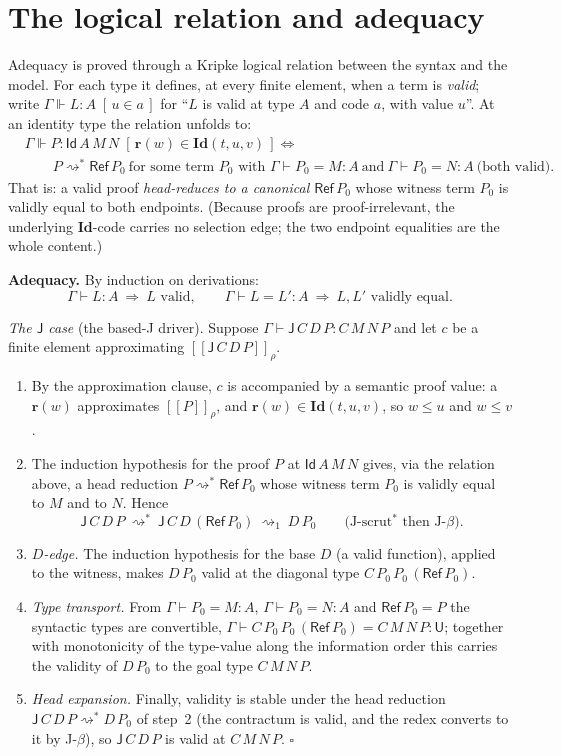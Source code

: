 \documentclass[11pt]{article}
\newcommand{\ty}[3]{#1 \vdash #2 : #3}
\newcommand{\cv}[4]{#1 \vdash #2 = #3 : #4}
\newcommand{\U}{\mathsf{U}}
\newcommand{\Id}{\mathsf{Id}}
\newcommand{\Rf}{\mathsf{Ref}}
\newcommand{\Jelim}{\mathsf{J}}
\newcommand{\redone}{\rightsquigarrow_1}
\newcommand{\red}{\rightsquigarrow^{*}}
\newcommand{\Ga}{\Gamma}
\newcommand{\cId}{\mathbf{Id}}
\newcommand{\rEl}{\mathbf{r}}
\newcommand{\sem}[1]{[\![#1]\!]}
\newcommand{\mem}[2]{#1 \in #2}                 %
\newcommand{\valid}[4]{#1 \Vdash #2 : #3 \;[\,#4\,]}
\begin{document}
\section*{The logical relation and adequacy}

Adequacy is proved through a Kripke logical relation between the syntax and the
model. For each type it defines, at every finite element, when a term is
\emph{valid}; write $\valid{\Ga}{L}{A}{\mem{u}{a}}$ for ``$L$ is valid at type
$A$ and code $a$, with value $u$''. At an identity type the relation unfolds to:
\[
\begin{aligned}
  &\valid{\Ga}{P}{\Id\,A\,M\,N}{\mem{\rEl(w)}{\cId(t,u,v)}} \iff{} \\
  &\qquad P \red \Rf\,P_0 \ \text{for some term $P_0$ with }
  \cv{\Ga}{P_0}{M}{A}\ \text{and}\ \cv{\Ga}{P_0}{N}{A}\ \text{(both valid).}
\end{aligned}
\]
That is: a valid proof \emph{head-reduces to a canonical $\Rf\,P_0$} whose
witness term $P_0$ is validly equal to both endpoints. (Because proofs are
proof-irrelevant, the underlying $\cId$-code carries no selection edge; the two
endpoint equalities are the whole content.)

\medskip
\noindent
\textbf{Adequacy.} By induction on derivations:
\[
  \ty{\Ga}{L}{A} \ \Longrightarrow\ L \text{ valid}, \qquad
  \cv{\Ga}{L}{L'}{A} \ \Longrightarrow\ L,L' \text{ validly equal.}
\]

\noindent
\emph{The $\Jelim$ case} (the based-J driver). Suppose
$\ty{\Ga}{\Jelim\,C\,D\,P}{C\,M\,N\,P}$ and let $c$ be a finite element
approximating $\sem{\Jelim\,C\,D\,P}_\rho$.

\begin{enumerate}\itemsep2pt
\item By the approximation clause, $c$ is accompanied by a semantic proof value:
  a $\rEl(w)$ approximates $\sem{P}_\rho$, and $\mem{\rEl(w)}{\cId(t,u,v)}$, so
  $w\le u$ and $w\le v$.
\item The induction hypothesis for the proof $P$ at $\Id\,A\,M\,N$ gives, via the
  relation above, a head reduction $P \red \Rf\,P_0$ whose witness term $P_0$ is
  validly equal to $M$ and to $N$. Hence
  \[
    \Jelim\,C\,D\,P \ \red\ \Jelim\,C\,D\,(\Rf\,P_0) \ \redone\ D\,P_0
    \qquad\text{(J-scrut${}^*$ then J-$\beta$).}
  \]
\item \emph{$D$-edge.} The induction hypothesis for the base $D$ (a valid
  function), applied to the witness, makes $D\,P_0$ valid at the diagonal type
  $C\,P_0\,P_0\,(\Rf\,P_0)$.
\item \emph{Type transport.} From $\cv{\Ga}{P_0}{M}{A}$, $\cv{\Ga}{P_0}{N}{A}$
  and $\Rf\,P_0 = P$ the syntactic types are convertible,
  $\cv{\Ga}{C\,P_0\,P_0\,(\Rf\,P_0)}{C\,M\,N\,P}{\U}$; together with monotonicity
  of the type-value along the information order this carries the validity of
  $D\,P_0$ to the goal type $C\,M\,N\,P$.
\item \emph{Head expansion.} Finally, validity is stable under the head reduction
  $\Jelim\,C\,D\,P \red D\,P_0$ of step~2 (the contractum is valid, and the redex
  converts to it by J-$\beta$), so $\Jelim\,C\,D\,P$ is valid at $C\,M\,N\,P$.
  \hfill$\square$
\end{enumerate}
\end{document}
